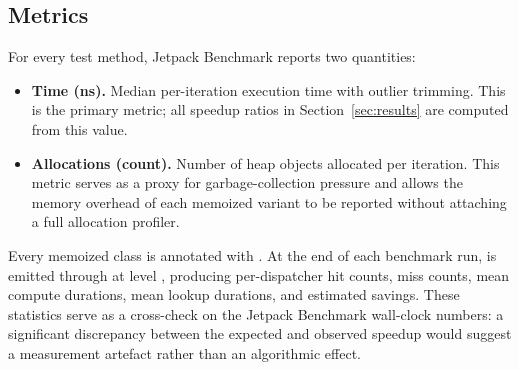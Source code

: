 \subsection{Metrics}\label{sec:metrics}

For every test method, Jetpack Benchmark reports two quantities:

\begin{itemize}[leftmargin=*,nosep]
    \item \textbf{Time (ns).} Median per-iteration execution time with outlier trimming. This is the primary metric; all speedup ratios in Section~\ref{sec:results} are computed from this value.
    \item \textbf{Allocations (count).} Number of heap objects allocated per iteration. This metric serves as a proxy for garbage-collection pressure and allows the memory overhead of each memoized variant to be reported without attaching a full allocation profiler.
\end{itemize}

Every memoized class is annotated with . At the end of each benchmark run,  is emitted through  at level , producing per-dispatcher hit counts, miss counts, mean compute durations, mean lookup durations, and estimated savings. These statistics serve as a cross-check on the Jetpack Benchmark wall-clock numbers: a significant discrepancy between the expected and observed speedup would suggest a measurement artefact rather than an algorithmic effect.
